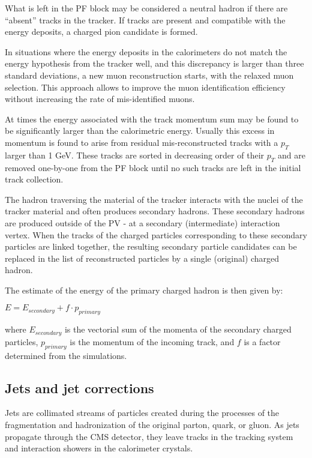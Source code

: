 What is left in the PF block may be considered a neutral hadron if there are ``absent'' tracks in the tracker. If tracks are present and compatible with the  energy deposits, a charged pion candidate is formed. 

In situations where the energy deposits in the calorimeters do not match the energy hypothesis from the tracker well, and this discrepancy is larger than three standard deviations, a new muon reconstruction starts, with the relaxed muon selection. This approach allows to improve the muon identification efficiency without increasing the rate of mis-identified muons. 

At times the energy associated with the track momentum sum may be found to be significantly larger than the calorimetric energy. Usually this excess in momentum is found to arise from residual mis-reconstructed tracks with a $p_T$ larger than 1 GeV. These tracks are sorted in decreasing order of their $p_T$ and are removed one-by-one from the PF block until no such tracks are left in the initial track collection.

The hadron traversing the material of the tracker interacts with the nuclei of the tracker material and often produces secondary hadrons. These secondary hadrons are produced outside of the PV - at a secondary (intermediate) interaction vertex. When the tracks of the charged particles corresponding to these secondary particles are linked together, the resulting secondary particle candidates can be  replaced in the list of reconstructed particles by a single (original) charged hadron.  

The estimate of the energy of the primary charged hadron is then given by:

$E = E_{secondary} + f \cdot p_{primary}$

\noindent where $E_{secondary}$ is the vectorial sum of the momenta of the secondary charged particles, $p_{primary}$ is the momentum of the incoming track, and $f$ is a factor determined from the simulations. 

\subsection{Jets and jet corrections}\label{sec:jets}

Jets are collimated streams of particles created during the processes of the fragmentation and hadronization of the original parton, quark, or gluon. As jets propagate through the CMS detector, they leave tracks in the tracking system and interaction showers in the calorimeter crystals. 


